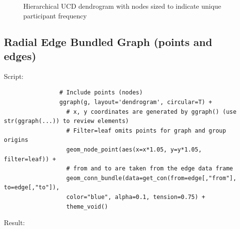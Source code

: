 \documentclass[10pt, letterpaper]{article}
\begin{document}
\begin{spacing}{1.0}
\begin{figure}[H]
    \centering
    \caption{Hierarchical UCD dendrogram with nodes sized to indicate unique participant frequency}
    \label{fg:dend3}
\end{figure}

\subsection{Radial Edge Bundled Graph (points and edges)}

Script:
\small
\begin{verbatim}
                # Include points (nodes)
                ggraph(g, layout='dendrogram', circular=T) +
                  # x, y coordinates are generated by ggraph() (use str(ggraph(...)) to review elements)
                  # Filter=leaf omits points for graph and group origins
                  geom_node_point(aes(x=x*1.05, y=y*1.05, filter=leaf)) +
                  # from and to are taken from the edge data frame
                  geom_conn_bundle(data=get_con(from=edge[,"from"], to=edge[,"to"]),
                  color="blue", alpha=0.1, tension=0.75) +
                  theme_void()
\end{verbatim}
\normalsize

Result:


\end{spacing}
\end{document}
